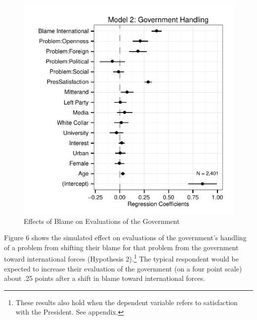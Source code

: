 \documentclass[12pt]{report}
\begin{document}
\begin{center}
\begin{figure}
\includegraphics{article1_govhandling_coefs}
\caption{Effects of Blame on Evaluations of the Government}
\end{figure}
\end{center}

Figure 6 shows the simulated effect on evaluations of the government's handling of a problem from
shifting their blame for that problem from the government toward international forces (Hypothesis
2).\footnote{These results also hold when the dependent variable refers to satisfaction with the
President. See appendix.} The typical respondent would be expected to increase their evaluation
of the government (on a four point scale) about .25 points after a shift in blame toward
international forces.
\end{document}
